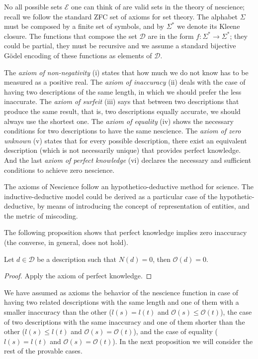 No all possible sets $\mathcal{E}$ one can think of are valid sets in the theory of nescience; recall we follow the standard ZFC set of axioms for set theory. The alphabet $\Sigma$ must be composed by a finite set of symbols, and by $\Sigma^\ast$ we denote its Kleene closure. The functions that compose the set $\mathcal{D}$ are in the form $f : \Sigma^\ast \rightarrow \Sigma^\ast$; they could be partial, they must be recursive and we assume a standard bijective Gödel encoding of these functions as elements of $\mathcal{D}$.

The \emph{axiom of non-negativity} (i) states that how much we do not know has to be measured as a positive real. The \emph{axiom  of inaccuracy} (ii) deals with the case of having two descriptions of the same length, in which we should prefer the less inaccurate. The \emph{axiom of surfeit} (iii) says that between two descriptions that produce the same result, that is, two descriptions equally accurate, we should always use the shortest one. The \emph{axiom of equality} (iv) shows the necessary conditions for two descriptions to have the same nescience. The \emph{axiom of zero unknown} (v) states that for every possible description, there exist an equivalent description (which is not necessarily unique) that provides perfect knowledge. And the last \emph{axiom of perfect knowledge} (vi) declares the necessary and sufficient conditions to achieve zero nescience.

The axioms of Nescience follow an hypothetico-deductive method for science. The inductive-deductive model could be derived as a particular case of the hypothetic-deductive, by means of introducing the concept of representation of entities, and the metric of miscoding.

The following proposition shows that perfect knowledge implies zero inaccuracy (the converse, in general, does not hold).

\begin{proposition}
Let $d \in \mathcal{D}$ be a description such that $N(d)=0$, then $\mathcal{O}(d)=0$.
\end{proposition}
\begin{proof}
Apply the axiom of perfect knowledge.
\end{proof}

We have assumed as axioms the behavior of the nescience function in case of having two related descriptions with the same length and one of them with a smaller inaccuracy than the other ($l(s) = l(t)$ and $\mathcal{O} (s) \leq \mathcal{O} (t)$), the case of two descriptions with the same inaccuracy and one of them shorter than the other ($l(s) \leq l(t)$ and $\mathcal{O} (s) = \mathcal{O} (t)$), and the case of equality ($l(s) = l(t)$ and $\mathcal{O} (s) = \mathcal{O} (t)$). In the next proposition we will consider the rest of the provable cases.

